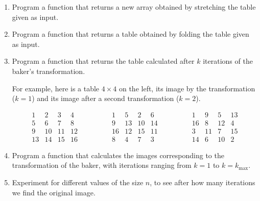 \documentclass[11pt,class=report,crop=false]{standalone}
\begin{document}
\begin{activite}



\begin{enumerate}
  \item Program a function  that returns a new array obtained by \og{}stretching\fg{} the table given as input.



    \item Program a function  that returns a table obtained by \og{}folding\fg{} the table given as input.
  
  
   \item Program a function  that returns the table calculated after $k$ iterations of the baker's transformation.
  
  For example, here is a table $4 \times 4$ on the left, its image by the transformation ($k=1$) and its image after a second transformation ($k=2$).
  
 $$\begin{array}{cccc} 
  1& 2& 3& 4\\ 
  5& 6& 7& 8\\  
  9&10&11&12\\  
 13&14&15&16  
\end{array}\qquad\qquad  
 \begin{array}{cccc} 
  1& 5& 2& 6\\ 
  9& 13& 10& 14\\  
  16&12&15&11\\  
  8&4&7&3  
\end{array}\qquad\qquad  
 \begin{array}{cccc} 
   1&    9&    5&   13 \\ 
 16&    8&   12&    4\\  
  3&   11&    7&   15\\  
 14&    6&   10&    2
\end{array}
$$ 
  \item Program a function   that calculates the images corresponding to the transformation of the baker, with iterations ranging from $k=1$ to $k=k_{\max}$.
  
  \item Experiment for different values of the size $n$, to see after how many iterations we find the original image. 
  

\end{enumerate}
\end{activite}
\end{document}
